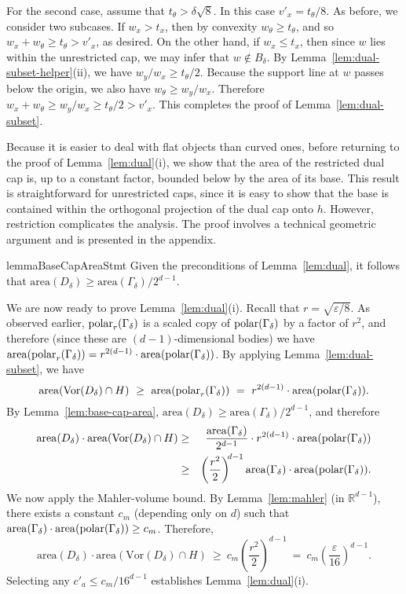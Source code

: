 \documentclass[11pt]{article}   \usepackage[letterpaper,hmargin=2.1cm,vmargin=3cm]{geometry}
\newcommand{\RE}{\mathbb{R}}    \newcommand{\ZZ}{\mathbb{Z}}    \newcommand{\eps}{\varepsilon}  \newcommand{\ST}{\,:\,}         \newcommand{\sq}{\square}
\newcommand{\area}{\mathrm{area}}
\newcommand{\Vor}{\mathrm{Vor}}
\begin{document}
For the second case, assume that $t_{\theta} > \delta\sqrt{8}$. In this case $v'_x = t_{\theta}/8$. As before, we consider two subcases. If $w_x > t_x$, then by convexity $w_{\theta} \ge t_{\theta}$, and so $w_x + w_{\theta} \ge t_{\theta} > v'_x$, as desired. On the other hand, if $w_x \le t_x$, then since $w$ lies within the unrestricted cap, we may infer that $w \notin B_{\delta}$. By Lemma~\ref{lem:dual-subset-helper}(ii), we have $w_y/w_x \ge t_{\theta}/2$. Because the support line at $w$ passes below the origin, we also have $w_{\theta} \ge w_y/w_x$. Therefore $w_x + w_{\theta} \ge w_y/w_x \ge t_{\theta}/2 > v'_x$. This completes the proof of Lemma~\ref{lem:dual-subset}.

\medskip

Because it is easier to deal with flat objects than curved ones, before returning to the proof of Lemma~\ref{lem:dual}(i), we show that the area of the restricted dual cap is, up to a constant factor, bounded below by the area of its base. This result is straightforward for unrestricted caps, since it is easy to show that the base is contained within the orthogonal projection of the dual cap onto $h$. However, restriction complicates the analysis. The proof involves a technical geometric argument and is presented in the appendix.

\begin{restatable}{lemma}{BaseCapAreaStmt}\label{lem:base-cap-area}
Given the preconditions of Lemma~\ref{lem:dual}, it follows that $\area(D_{\delta}) \ge \area(\Gamma_{\delta}) / 2^{d-1}$.
\end{restatable}


\medskip

We are now ready to prove Lemma~\ref{lem:dual}(i). Recall that $r = \sqrt{\eps/8}$. As observed earlier, $\mathrm{polar}_{r}(\Gamma_{\delta})$ is a scaled copy of $\mathrm{polar}(\Gamma_{\delta})$ by a factor of $r^2$, and therefore (since these are $(d-1)$-dimensional bodies) we have $\area(\polarX{r}{\Gamma_{\delta}}) = r^{2(d-1)} \cdot \area(\polar{\Gamma_{\delta}})$. By applying Lemma~\ref{lem:dual-subset}, we have
\[
	\area(\Vor(D_{\delta}) \cap H)
		~ \ge ~ \area(\polarX{r}{\Gamma_{\delta}})
		~  =  ~ r^{2(d-1)} \cdot \area(\polar{\Gamma_{\delta}}).
	\label{eqn:dual-subset-bound}
\]
By Lemma~\ref{lem:base-cap-area}, $\area(D_{\delta}) \ge \area(\Gamma_{\delta}) / 2^{d-1}$, and therefore
\begin{eqnarray*}
	\area(D_{\delta}) \cdot \area(\Vor(D_{\delta}) \cap H)
		& \ge & \frac{\area(\Gamma_{\delta})}{2^{d-1}} \cdot r^{2(d-1)} \cdot \area(\polar{\Gamma_{\delta}}) \\
		& \ge & \left( \frac{r^2}{2} \right)^{\N d-1} \area(\Gamma_{\delta}) \cdot \area(\polar{\Gamma_{\delta}}).
\end{eqnarray*}
We now apply the Mahler-volume bound. By Lemma~\ref{lem:mahler} (in $\RE^{d-1}$), there exists a constant $c_m$ (depending only on $d$) such that $\area(\Gamma_{\delta}) \cdot \area(\polar{\Gamma_{\delta}}) \ge c_m$. Therefore,
\[
	\area(D_{\delta}) \cdot \area(\Vor(D_{\delta}) \cap H)
		~ \ge ~ c_m \left( \frac{r^2}{2} \right)^{d-1} 
		~  =  ~ c_m \left( \frac{\eps}{16} \right)^{d-1}.
\]
Selecting any $c'_a \le c_m/16^{d-1}$ establishes Lemma~\ref{lem:dual}(i).
\end{document}
